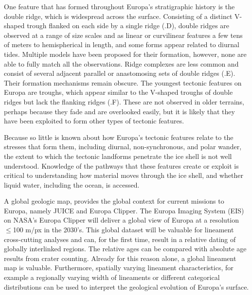 One feature that has formed throughout Europa’s stratigraphic history is the double ridge, which is widespread across the surface. Consisting of a distinct V-shaped trough flanked on each side by a single ridge (.D), double ridges are observed at a range of size scales and as linear or curvilinear features a few tens of meters to hemispherical in length, and some forms appear related to diurnal tides. Multiple models have been proposed for their formation, however, none are able to fully match all the observations. Ridge complexes are less common and consist of several adjacent parallel or anastomosing sets of double ridges (.E). Their formation mechanisms remain obscure. The youngest tectonic features on Europa are troughs, which appear similar to the V-shaped troughs of double ridges but lack the flanking ridges (.F). These are not observed in older terrains, perhaps because they fade and are overlooked easily, but it is likely that they have been exploited to form other types of tectonic features. 
 
Because so little is known about how Europa’s tectonic features relate to the stresses that form them, including diurnal, non-synchronous, and polar wander, the extent to which the tectonic landforms penetrate the ice shell is not well understood. Knowledge of the pathways that these features create or exploit is critical to understanding how material moves through the ice shell, and whether liquid water, including the ocean, is accessed. 

A global geologic map, provides the global context for current missions to Europa, namely JUICE and Europa Clipper. The Europa Imaging System (EIS) on NASA's Europa Clipper will deliver a global view of Europa at a resolution $\leq$100 m/px in the 2030's. This global dataset will be valuable for lineament cross-cutting analyses and can, for the first time, result in a relative dating of globally interlinked regions. The relative ages can be compared with absolute age results from crater counting. Already for this reason alone, a global lineament map is valuable. Furthermore, spatially varying lineament characteristics, for example a regionally varying width of lineaments or different categorical distributions can be used to interpret the geological evolution of Europa's surface.

